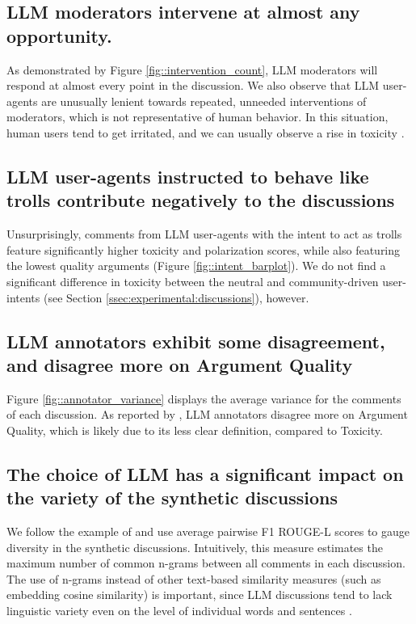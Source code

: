 \subsection{LLM moderators intervene at almost any opportunity.}

As demonstrated by Figure \ref{fig::intervention_count}, \ac{LLM} moderators will respond at almost every point in the discussion. We also observe that \ac{LLM} user-agents are unusually lenient towards repeated, unneeded interventions of moderators, which is not representative of human behavior. In this situation, human users tend to get irritated, and we can usually observe a rise in toxicity \cite{schaffner_community_guidelines, make_reddit_great, proactive_moderation, cresci_pesonalized_interventions}.


\subsection{LLM user-agents instructed to behave like trolls contribute negatively to the discussions}

Unsurprisingly, comments from \ac{LLM} user-agents with the intent to act as trolls feature significantly higher toxicity and polarization scores, while also featuring the lowest quality arguments (Figure \ref{fig::intent_barplot}). We do not find a significant difference in toxicity between the neutral and community-driven user-intents (see Section \ref{ssec:experimental:discussions}), however.


\subsection{LLM annotators exhibit some disagreement, and disagree more on Argument Quality}

Figure \ref{fig::annotator_variance} displays the average variance for the comments of each discussion. As reported by \citet{argyle2023}, \ac{LLM} annotators disagree more on Argument Quality, which is likely due to its less clear definition, compared to Toxicity.


\subsection{The choice of LLM has a significant impact on the variety of the synthetic discussions}

We follow the example of \citet{ulmer2024bootstrappingllmbasedtaskorienteddialogue} and use average pairwise F1 ROUGE-L scores \cite{lin-2004-rouge} to gauge diversity in the synthetic discussions. Intuitively, this measure estimates the maximum number of common n-grams between all comments in each discussion. The use of n-grams instead of other text-based similarity measures (such as embedding cosine similarity) is important, since \ac{LLM} discussions tend to lack linguistic variety even on the level of individual words and sentences \cite{ulmer2024bootstrappingllmbasedtaskorienteddialogue}. 

